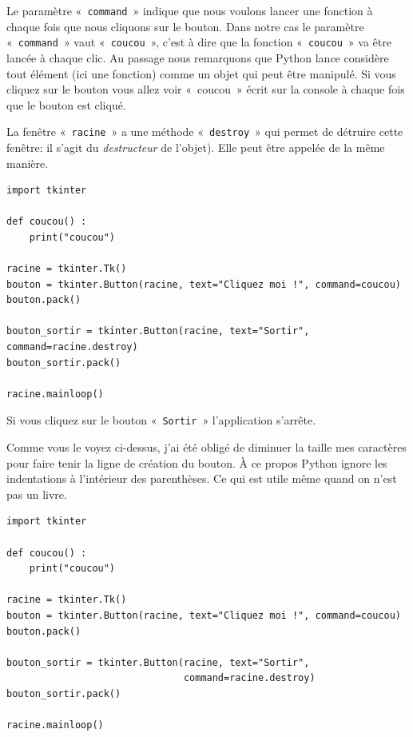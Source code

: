 Le paramètre «~\texttt{command}~» indique que nous voulons lancer une fonction à chaque fois que nous cliquons sur le bouton. Dans notre cas le paramètre «~\texttt{command}~» vaut «~\texttt{coucou}~», c'est à dire que la fonction «~\texttt{coucou}~» va être lancée à chaque clic. Au passage nous remarquons que Python lance considère tout élément (ici une fonction) comme un objet qui peut être manipulé. Si vous cliquez sur le bouton vous allez voir «~coucou~»  écrit sur la console à chaque fois que le bouton est cliqué.


La fenêtre «~\texttt{racine}~» a une méthode «~\texttt{destroy}~» qui permet de détruire cette fenêtre: il s'agit du \emph{destructeur} de l'objet). Elle peut être appelée de la même manière.

\begin{small}
\begin{Verbatim}[frame=single,rulecolor=\color{mbleu}, label=à taper]
import tkinter

def coucou() :
    print("coucou")

racine = tkinter.Tk()
bouton = tkinter.Button(racine, text="Cliquez moi !", command=coucou)
bouton.pack()

bouton_sortir = tkinter.Button(racine, text="Sortir", command=racine.destroy)
bouton_sortir.pack()

racine.mainloop()
\end{Verbatim}
\end{small}

Si vous cliquez sur le bouton «~\texttt{Sortir}~» l'application s'arrête.

Comme vous le voyez ci-dessus, j'ai été obligé de diminuer la taille mes caractères pour faire tenir la ligne de création du bouton. À ce propos Python ignore les indentations à l'intérieur des parenthèses. Ce qui est utile même quand on n'est pas un livre. 

\begin{Verbatim}[frame=single,rulecolor=\color{gray}, label=ne pas saisir]
import tkinter

def coucou() :
    print("coucou")

racine = tkinter.Tk()
bouton = tkinter.Button(racine, text="Cliquez moi !", command=coucou)
bouton.pack()

bouton_sortir = tkinter.Button(racine, text="Sortir",
                               command=racine.destroy)
bouton_sortir.pack()

racine.mainloop()
\end{Verbatim}
 

